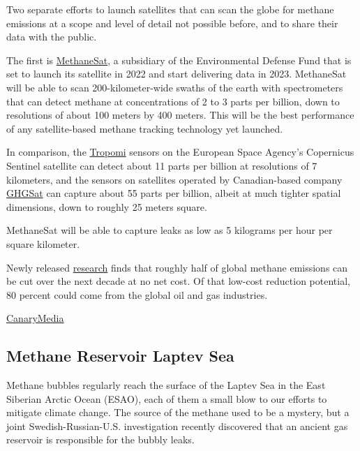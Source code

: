 \documentclass[
]{book}
\begin{document}
Two separate efforts to launch satellites that can scan the globe for methane emissions at a scope and level of detail not possible before, and to share their data with the public.

The first is \href{https://www.methanesat.org/}{MethaneSat}, a subsidiary of the Environmental Defense Fund that is set to launch its satellite in 2022 and start delivering data in 2023. MethaneSat will be able to scan 200-kilometer-wide swaths of the earth with spectrometers that can detect methane at concentrations of 2 to 3 parts per billion, down to resolutions of about 100 meters by 400 meters.
This will be the best performance of any satellite-based methane tracking technology yet launched.

In comparison, the \href{http://www.tropomi.eu/data-products/methane}{Tropomi} sensors on the European Space Agency's Copernicus Sentinel satellite can detect about 11 parts per billion at resolutions of 7 kilometers, and the sensors on satellites operated by Canadian-based company \href{https://www.ghgsat.com/pulse/}{GHGSat} can capture about 55 parts per billion, albeit at much tighter spatial dimensions, down to roughly 25 meters square.

MethaneSat will be able to capture leaks as low as 5 kilograms per hour per square kilometer.

Newly released \href{https://www.edf.org/media/study-cutting-methane-emissions-quickly-could-slow-climate-warming-rate-30}{research} finds that roughly half of global methane emissions can be cut over the next decade at no net cost. Of that low-cost reduction potential, 80 percent could come from the global oil and gas industries.

\href{https://www.canarymedia.com/articles/how-new-satellites-can-drive-action-against-methanes-outsize-impact-on-climate-change/}{CanaryMedia}

\hypertarget{methane-reservoir-laptev-sea}{%
\subsection{Methane Reservoir Laptev Sea}\label{methane-reservoir-laptev-sea}}

Methane bubbles regularly reach the surface of the Laptev Sea in the East Siberian Arctic Ocean (ESAO), each of them a small blow to our efforts to mitigate climate change. The source of the methane used to be a mystery, but a joint Swedish-Russian-U.S. investigation recently discovered that an ancient gas reservoir is responsible for the bubbly leaks.
\end{document}
